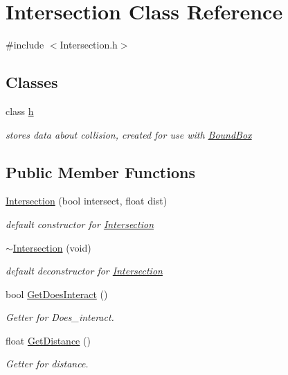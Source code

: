 \hypertarget{class_intersection}{}\section{Intersection Class Reference}
\label{class_intersection}


{\ttfamily \#include $<$Intersection.\+h$>$}

\subsection*{Classes}
\begin{DoxyCompactItemize}
\item 
class \hyperlink{class_intersection_1_1h}{h}
\begin{DoxyCompactList}\small\item\em stores data about collision, created for use with \hyperlink{class_bound_box}{Bound\+Box} \end{DoxyCompactList}\end{DoxyCompactItemize}
\subsection*{Public Member Functions}
\begin{DoxyCompactItemize}
\item 
\hyperlink{class_intersection_a3cf3b92f8c7d13bd6f8cbc02c766c152}{Intersection} (bool intersect, float dist)
\begin{DoxyCompactList}\small\item\em default constructor for \hyperlink{class_intersection}{Intersection} \end{DoxyCompactList}\item 
\hyperlink{class_intersection_a1bd2c788b17c6e3d1099744a119db88d}{$\sim$\+Intersection} (void)
\begin{DoxyCompactList}\small\item\em default deconstructor for \hyperlink{class_intersection}{Intersection} \end{DoxyCompactList}\item 
bool \hyperlink{class_intersection_a32553619dfef2d6e7c9e93235cd40a19}{Get\+Does\+Interact} ()
\begin{DoxyCompactList}\small\item\em Getter for Does\+\_\+interact. \end{DoxyCompactList}\item 
float \hyperlink{class_intersection_ae13dac4c265f7920c017a06e90335662}{Get\+Distance} ()
\begin{DoxyCompactList}\small\item\em Getter for distance. \end{DoxyCompactList}\end{DoxyCompactItemize}


